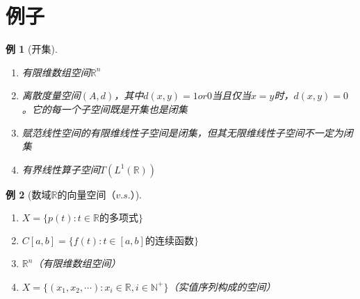 \documentclass{article}                     %
\numberwithin{equation}{section}            %
\numberwithin{figure}{section}              %
\numberwithin{table}{section}               %
\newtheorem{example}{\indent 例}[section]
\begin{document}
\section{例子}
\begin{example}[开集]
    \begin{enumerate}
        \item 有限维数组空间$\mathbb{R} ^n$
        \item 离散度量空间$(A,d)$，其中$d(x,y)=1 or 0$当且仅当$x=y$时，$d(x,y)=0$。它的每一个子空间既是开集也是闭集
        \item 赋范线性空间的有限维线性子空间是闭集，但其无限维线性子空间不一定为闭集
        \item 有界线性算子空间$T(L^1(\mathbb{R} ))$
    \end{enumerate}
\end{example}


\begin{example}[数域$\mathbb{R} $的向量空间（$v.s.$）]
    \begin{enumerate}
        \item $X=\{p(t):t\in \mathbb{R} \mbox{的多项式}\}$
        \item $C[a,b]=\{f(t):t\in[a,b]\mbox{的连续函数}\}$
        \item $\mathbb{R} ^n$（有限维数组空间）
        \item $X=\{(x_1,x_2,\cdots):x_i\in \mathbb{R} ,i\in \mathbb{N} ^+\}$（实值序列构成的空间）
    \end{enumerate}
\end{example}
\end{document}
